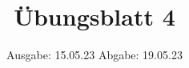 

\title{Übungsblatt 4}
\date{%
  Ausgabe: 15.05.23 %
  \hspace{3em}
  Abgabe: 19.05.23 %
}



\maketitle
\thispagestyle{empty}
\tableofcontents
\newpage






